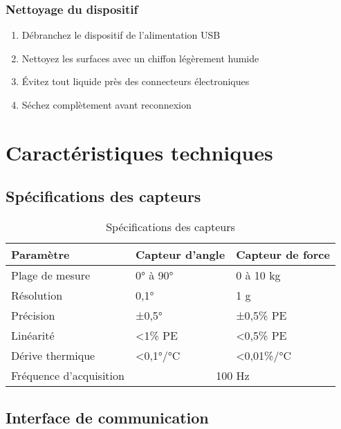 \documentclass[12pt,a4paper]{article}
\begin{document}
\subsubsection{Nettoyage du dispositif}

\begin{enumerate}
    \item Débranchez le dispositif de l'alimentation USB
    \item Nettoyez les surfaces avec un chiffon légèrement humide
    \item Évitez tout liquide près des connecteurs électroniques
    \item Séchez complètement avant reconnexion
\end{enumerate}

\section{Caractéristiques techniques}

\subsection{Spécifications des capteurs}

\begin{table}[H]
\centering
\begin{tabular}{|l|l|l|}
\hline
\textbf{Paramètre} & \textbf{Capteur d'angle} & \textbf{Capteur de force} \\
\hline
Plage de mesure & 0° à 90° & 0 à 10 kg \\
\hline
Résolution & 0,1° & 1 g \\
\hline
Précision & ±0,5° & ±0,5\% PE \\
\hline
Linéarité & <1\% PE & <0,5\% PE \\
\hline
Dérive thermique & <0,1°/°C & <0,01\%/°C \\
\hline
Fréquence d'acquisition & \multicolumn{2}{|c|}{100 Hz} \\
\hline
\end{tabular}
\caption{Spécifications des capteurs}
\label{tab:specs_capteurs}
\end{table}

\subsection{Interface de communication}
\end{document}

